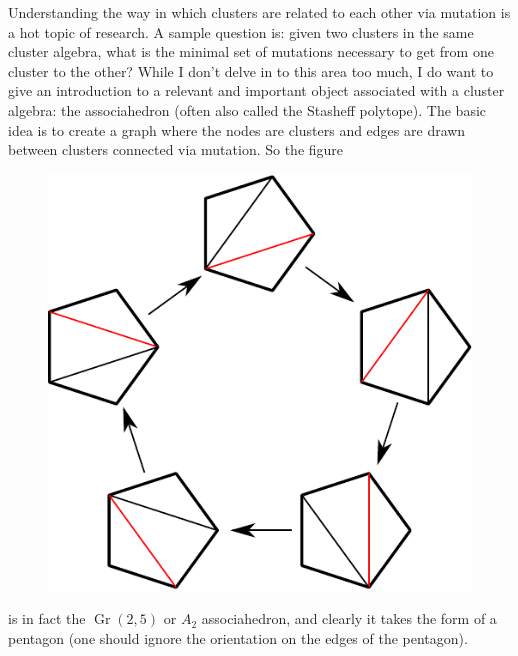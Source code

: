 \documentclass[11pt]{article}
\DeclareMathOperator{\Gr}{Gr}
\begin{document}
Understanding the way in which clusters are related to each other via mutation is a hot topic of research. A sample question is: given two clusters in the same cluster algebra, what is the minimal set of mutations necessary to get from one cluster to the other? While I don't delve in to this area too much, I do want to give an introduction to a relevant and important object associated with a cluster algebra: the associahedron (often also called the Stasheff polytope). The basic idea is to create a graph where the nodes are clusters and edges are drawn between clusters connected via mutation. So the figure
\begin{figure}[h]
  \centering
  \includegraphics[scale=0.6]{pentagon-triangulations}
\end{figure}

is in fact the $\Gr(2,5)$ or $A_2$ associahedron, and clearly it takes the form of a pentagon (one should ignore the orientation on the edges of the pentagon).
\end{document}
